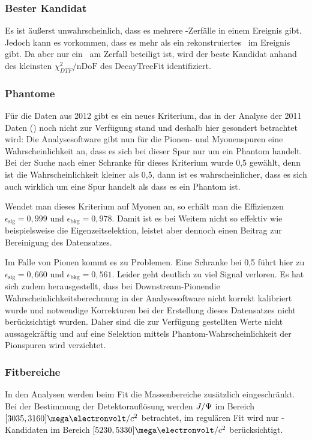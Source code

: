 \subsubsection{Bester Kandidat}
Es ist äußerst unwahrscheinlich, dass es mehrere \Decaychannel-Zerfälle in einem Ereignis gibt. Jedoch kann es vorkommen, dass es mehr als ein rekonstruiertes \Bd\ im Ereignis gibt. Da aber nur ein \Bd\ am Zerfall beteiligt ist, wird der beste Kandidat anhand des kleinsten $\chi^2_{DTF}/\text{nDoF}$ des DecayTreeFit identifiziert. \cite{lhcb-paper}

\subsubsection{Phantome}
Für die Daten aus 2012 gibt es ein neues Kriterium, das in der Analyse der 2011 Daten (\cite{lhcb-paper}) noch nicht zur Verfügung stand und deshalb hier gesondert betrachtet wird: Die Analysesoftware gibt nun für die Pionen- und Myonenspuren eine Wahrscheinlichkeit an, dass es sich bei dieser Spur nur um ein Phantom handelt. Bei der Suche nach einer Schranke für dieses Kriterium wurde 0,5 gewählt, denn ist die Wahrscheinlichkeit kleiner als 0,5, dann ist es wahrscheinlicher, dass es sich auch wirklich um eine Spur handelt als dass es ein Phantom ist.

Wendet man dieses Kriterium auf Myonen an, so erhält man die Effizienzen $\epsilon_{\text{sig}}=0,999$ und $\epsilon_{\text{bkg}}=0,978$. Damit ist es bei Weitem nicht so effektiv wie beispielsweise die Eigenzeitselektion, leistet aber dennoch einen Beitrag zur Bereinigung des Datensatzes.

Im Falle von Pionen kommt es zu Problemen. Eine Schranke bei 0,5 führt hier zu $\epsilon_{\text{sig}}=0,660$ und $\epsilon_{\text{bkg}}=0,561$. Leider geht deutlich zu viel Signal verloren. Es hat sich zudem herausgestellt, dass bei \glqq Downstream-Pionen\grqq die Wahrscheinlichkeitsberechnung in der Analysesoftware nicht korrekt kalibriert wurde und notwendige Korrekturen bei der Erstellung dieses Datensatzes nicht berücksichtigt wurden. Daher sind die zur Verfügung gestellten Werte nicht aussagekräftig und auf eine Selektion mittels Phantom-Wahrscheinlichkeit der Pionspuren wird verzichtet.

\subsubsection{Fitbereiche}
In den Analysen werden beim Fit die Massenbereiche zusätzlich eingeschränkt. Bei der Bestimmung der Detektorauflösung werden $J/\Psi$ im Bereich $[3035, 3160]\mega\electronvolt/c^2$ betrachtet, im regulären Fit wird nur \Bd-Kandidaten im Bereich $[5230, 5330]\mega\electronvolt/c^2$ berücksichtigt.

